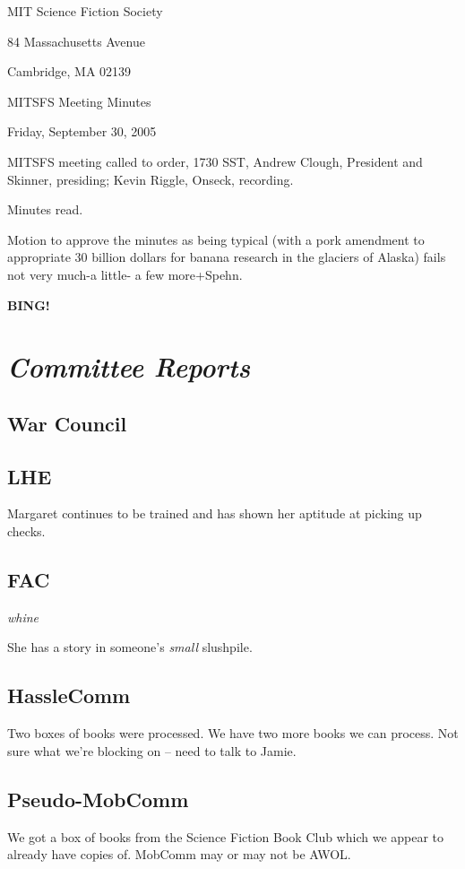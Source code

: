\documentclass[10pt]{article}
\newcommand{\bing}{{\bf BING!} }
\newcommand{\goto}[1]{\bing \vskip 12pt \section*{{\em{#1}}}}
\begin{document}
\begin{center}

MIT Science Fiction Society

84 Massachusetts Avenue

Cambridge, MA 02139

\vspace{12pt}

MITSFS Meeting Minutes

Friday, September 30, 2005

\end{center}

\vspace{18pt}

\setlength{\parskip}{6pt}

\noindent
MITSFS meeting called to order, 1730 SST, Andrew Clough, President and 
Skinner, presiding; Kevin Riggle,  Onseck, recording.

Minutes read.

Motion to approve the minutes as being typical (with a pork amendment to appropriate
30 billion dollars for banana research in the glaciers of Alaska) fails not very much-a little-
a few more+Spehn.

\goto{Committee Reports}
\subsection*{War Council}

\subsection*{LHE}
Margaret continues to be trained and has shown her aptitude at picking up checks.

\subsection*{FAC}
\emph{whine}

She has a story in someone's \emph{small} slushpile.

\subsection*{HassleComm}
Two boxes of books were processed.  We have two more books we can process.  Not sure what
we're blocking on -- need to talk to Jamie.

\subsection*{Pseudo-MobComm}
We got a box of books from the Science Fiction Book Club which we appear to already have
copies of.  MobComm may or may not be AWOL.
\end{document}
